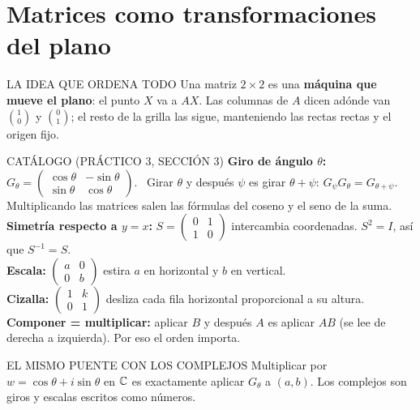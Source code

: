 \section{Matrices como transformaciones del plano}
\begin{tip}{LA IDEA QUE ORDENA TODO}
Una matriz $2\times2$ es una \textbf{máquina que mueve el plano}: el punto $X$ va a $AX$. Las columnas de $A$ dicen adónde van $\binom10$ y $\binom01$; el resto de la grilla las sigue, manteniendo las rectas rectas y el origen fijo.
\end{tip}
\begin{center}
\end{center}
\begin{memo}{CATÁLOGO (PRÁCTICO 3, SECCIÓN 3)}
\textbf{Giro de ángulo $\theta$:} $G_\theta=\begin{pmatrix}\cos\theta&-\sin\theta\\\sin\theta&\cos\theta\end{pmatrix}$. \ Girar $\theta$ y después $\psi$ es girar $\theta+\psi$: $G_\psi G_\theta=G_{\theta+\psi}$. Multiplicando las matrices salen las fórmulas del coseno y el seno de la suma.\\[2pt]
\textbf{Simetría respecto a $y=x$:} $S=\begin{pmatrix}0&1\\1&0\end{pmatrix}$ intercambia coordenadas. $S^2=I$, así que $S^{-1}=S$.\\[2pt]
\textbf{Escala:} $\begin{pmatrix}a&0\\0&b\end{pmatrix}$ estira $a$ en horizontal y $b$ en vertical.\\[2pt]
\textbf{Cizalla:} $\begin{pmatrix}1&k\\0&1\end{pmatrix}$ desliza cada fila horizontal proporcional a su altura.\\[2pt]
\textbf{Componer = multiplicar:} aplicar $B$ y después $A$ es aplicar $AB$ (se lee de derecha a izquierda). Por eso el orden importa.
\end{memo}
\begin{tip}{EL MISMO PUENTE CON LOS COMPLEJOS}
Multiplicar por $w=\cos\theta+i\sin\theta$ en $\mathbb{C}$ es exactamente aplicar $G_\theta$ a $(a,b)$. Los complejos son giros y escalas escritos como números.
\end{tip}

